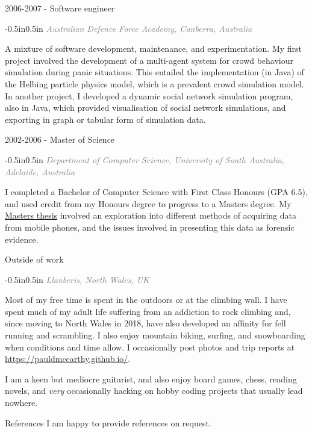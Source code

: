 \documentclass{resume}
\begin{document}
\begin{category}{2006-2007 - Software engineer}
\citemnobullet
\begin{changemargin}{-0.5in}{0.5in}
\textcolor{grey}{\textit{Australian Defence Force Academy, Canberra, Australia}}
\end{changemargin}

\citemnobullet A mixture of software development, maintenance, and experimentation.
My first project involved the development of a multi-agent system for
crowd behaviour simulation during panic situations. This entailed the
implementation (in Java) of the Helbing particle physics model, which
is a prevalent crowd simulation model. In another project, I developed
a dynamic social network simulation program, also in Java, which
provided visualisation of social network simulations, and exporting in
graph or tabular form of simulation data.

\end{category}




\begin{category}{2002-2006 - Master of Science}
\citemnobullet
\begin{changemargin}{-0.5in}{0.5in}
\textcolor{grey}{\textit{Department of Computer Science, University of South Australia, Adelaide, Australia}}
\end{changemargin}

\citemnobullet I completed a Bachelor of Computer Science with First Class Honours
(GPA 6.5), and used credit from my Honours degree to progress to a
Masters degree. My \href{forensic_analysis_of_mobile_phones.pdf}{Masters thesis} involved an
exploration into different methods of acquiring data from mobile
phones, and the issues involved in presenting this data as forensic
evidence.

\end{category}




\begin{category}{Outside of work}
\citemnobullet
\begin{changemargin}{-0.5in}{0.5in}
\textcolor{grey}{\textit{Llanberis, North Wales, UK}}
\end{changemargin}

\citemnobullet Most of my free time is spent in the outdoors or at the climbing
wall. I have spent much of my adult life suffering from an addiction
to rock climbing and, since moving to North Wales in 2018, have also
developed an affinity for fell running and scrambling. I also enjoy
mountain biking, surfing, and snowboarding when conditions and time
allow. I occasionally post photos and trip reports at \mbox{\small\url{https://pauldmccarthy.github.io/}}.\newline

I am a keen but mediocre guitarist, and also enjoy board games, chess,
reading novels, and \textit{very} occasionally hacking on hobby
coding projects that usually lead nowhere.

\end{category}




\begin{category}{References}
\citemnobullet I am happy to provide references on request.
\end{category}
\end{document}
